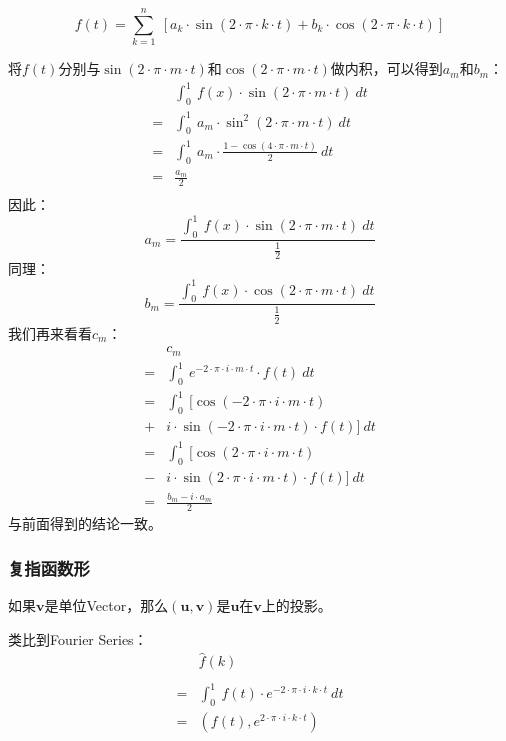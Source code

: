 $$f(t)=\sum\limits_{k=1}^n\ [a_k\cdot \sin(2\cdot\pi\cdot k\cdot t) +b_k\cdot \cos(2\cdot \pi\cdot k\cdot t)]$$

将$f(t)$分别与$\sin(2\cdot \pi\cdot m \cdot t)$和$\cos(2\cdot \pi\cdot m \cdot t)$做内积，可以得到$a_m$和$b_m$：
\begin{align*}
	  & \int_0^1\ f(x)\cdot \sin(2\cdot \pi\cdot m \cdot t)\ dt            \\
	= & \int_0^1\ a_m\cdot \sin^2(2\cdot \pi\cdot m \cdot t)\ dt           \\
	= & \int_0^1\ a_m\cdot \frac{1-\cos(4\cdot \pi\cdot m \cdot t)}{2}\ dt \\
	= & \frac{a_m}{2}                                                      \\
\end{align*}
因此：
$$
	a_m=\frac{\int_0^1\ f(x)\cdot \sin(2\cdot \pi\cdot m \cdot t)\ dt}{\frac{1}{2}}
$$
同理：
$$
	b_m=\frac{\int_0^1\ f(x)\cdot \cos(2\cdot \pi\cdot m \cdot t)\ dt}{\frac{1}{2}}
$$
我们再来看看$c_m$：
\begin{align*}
	  & c_m                                                           \\
	= & \int_0^1 \ e^{-2\cdot \pi\cdot i\cdot m\cdot t}\cdot f(t)\ dt \\
	= & \int_0^1 \ [\cos(-2\cdot \pi\cdot i\cdot m\cdot t)            \\
	+ & i\cdot \sin(-2\cdot \pi\cdot i\cdot m\cdot t)\cdot f(t)]\ dt  \\
	= & \int_0^1 \ [\cos(2\cdot \pi\cdot i\cdot m\cdot t)             \\
	- & i\cdot \sin(2\cdot \pi\cdot i\cdot m\cdot t)\cdot f(t)]\ dt   \\
	= & \frac{b_m-i\cdot a_m}{2}
\end{align*}
与前面得到的结论一致。
\subsubsection{复指函数形}
如果$\mathbf{v}$是单位Vector，那么$(\mathbf{u},\mathbf{v})$是$\mathbf{u}$在$\mathbf{v}$上的投影。

类比到Fourier Series：
\begin{align*}
	  & \hat{f}(k)                                                    \\                                          \\
	= & \int_0^1 \ f(t)\cdot e^{-2\cdot \pi\cdot i\cdot k\cdot t}\ dt \\
	= & (f(t),e^{2\cdot \pi\cdot i\cdot k\cdot t})
\end{align*}


